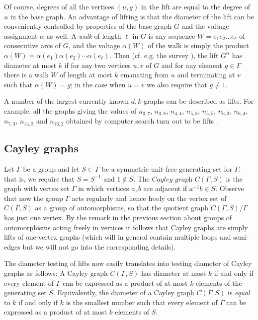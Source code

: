 \documentclass[a4paper,12pt,oneside]{report}%
\begin{document}
Of course, degrees of all the vertices $(u,g)$ in the lift are equal to the degree of $u$ in the base graph. An advantage of lifting is that the diameter of the lift can be conveniently controlled by properties of the base graph $G$ and the voltage assignment $\alpha$ as well. A {\em walk} of length $\ell$ in $G$ is any sequence  $W=e_1e_2\ldots e_{\ell}$ of consecutive arcs of $G$, and the voltage $\alpha(W)$ of the walk is simply the product $\alpha(W)=\alpha(e_1)\alpha(e_2)\cdots \alpha(e_{\ell})$. Then (cf. e.g. the survey \cite{Mil-Sir}), the lift $G^{\alpha}$ has diameter at most $k$ if for any two vertices $u,v$ of $G$ and for any element $g\in \Gamma$ there is a walk $W$ of length at most $k$ emanating from $u$ and terminating at $v$ such that $\alpha(W)=g$; in the case when $u=v$ we also require that $g\ne 1$.
\medskip

A number of the largest currently known ${d,k}$-graphs can be described as lifts. For example, all the graphs giving the values of $n_{3,7}$, $n_{3,8}$, $n_{4,4}$, $n_{5,3}$, $n_{5,5}$, $n_{6,3}$, $n_{6,4}$, $n_{7,3}$, $n_{14, 3}$ and $n_{16,2}$ obtained by computer search turn out to be lifts \cite{Mil-Sir}.


\subsection{Cayley graphs}
Let $\Gamma$ be a group and let $S\subset \Gamma$ be a symmetric unit-free generating set for $\Gamma$; that is, we require that $S=S^{-1}$ and $1\notin S$. The $\textit{Cayley graph}$ $C(\Gamma,S)$ is the graph with vertex set $\Gamma$ in which vertices $a,b$ are adjacent if $a^{-1}b\in S$. Observe that now the group $\Gamma$ acts regularly and hence freely on the vertex set of $C(\Gamma,S)$ as a group of automorphisms, so that the quotient graph $C(\Gamma,S)/\Gamma$ has just one vertex. By the remark in the previous section about groups of automorphisms acting freely in vertices it follows that Cayley graphs are simply lifts of one-vertex graphs (which will in general contain multiple loops and semi-edges but we will not go into the corresponding details).
\medskip

The diameter testing of lifts now easily translates into testing diameter of Cayley graphs as follows: A Cayley graph $C(\Gamma,S)$ has diameter at most $k$ if and only if every element of $\Gamma$ can be expressed as a product of at most $k$ elements of the generating set $S$. Equivalently, the diameter of a Cayley graph $C(\Gamma,S)$ is {\em equal} to $k$ if and only if $k$ is the smallest number such that every element of $\Gamma$ can be expressed as a product of at most $k$ elements of $S$.
\medskip
\end{document}
